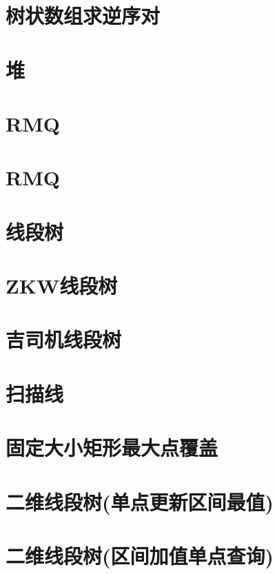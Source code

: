 \section{树状数组求逆序对}
\raggedbottom
\hrulefill
\section{堆}
\raggedbottom
\hrulefill
\section{RMQ}
\raggedbottom
\hrulefill
\section{RMQ}
\raggedbottom
\hrulefill
\section{线段树}
\raggedbottom
\hrulefill
\section{ZKW线段树}
\raggedbottom
\hrulefill
\section{吉司机线段树}
\raggedbottom
\hrulefill
\section{扫描线}
\raggedbottom
\hrulefill
\section{固定大小矩形最大点覆盖}
\raggedbottom
\hrulefill
\section{二维线段树(单点更新区间最值)}
\raggedbottom
\hrulefill
\section{二维线段树(区间加值单点查询)}
\raggedbottom
\hrulefill

